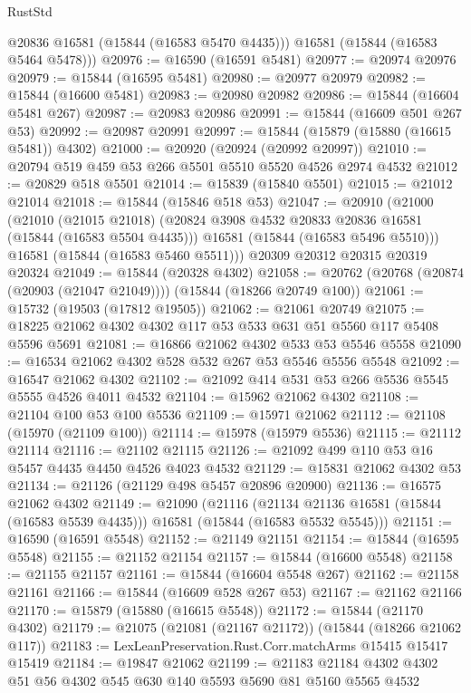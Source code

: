 \begin{lexlean}{RustStd}
\begin{coremodule}
        @20836
        @16581
        (@15844 (@16583 @5470 @4435)))
      @16581
      (@15844 (@16583 @5464 @5478)))
@20976 := @16590 (@16591 @5481)
@20977 := @20974 @20976
@20979 := @15844 (@16595 @5481)
@20980 := @20977 @20979
@20982 := @15844 (@16600 @5481)
@20983 := @20980 @20982
@20986 := @15844 (@16604 @5481 @267)
@20987 := @20983 @20986
@20991 := @15844 (@16609 @501 @267 @53)
@20992 := @20987 @20991
@20997 := @15844 (@15879 (@15880 (@16615 @5481)) @4302)
@21000 := @20920 (@20924 (@20992 @20997))
@21010 := @20794 @519 @459 @53 @266 @5501 @5510 @5520 @4526 @2974 @4532
@21012 := @20829 @518 @5501
@21014 := @15839 (@15840 @5501)
@21015 := @21012 @21014
@21018 := @15844 (@15846 @518 @53)
@21047 := @20910
    (@21000
      (@21010
        (@21015 @21018)
        (@20824 @3908 @4532 @20833 @20836 @16581 (@15844 (@16583 @5504 @4435)))
        @16581
        (@15844 (@16583 @5496 @5510)))
      @16581
      (@15844 (@16583 @5460 @5511)))
    @20309
    @20312
    @20315
    @20319
    @20324
@21049 := @15844 (@20328 @4302)
@21058 := @20762 (@20768 (@20874 (@20903 (@21047 @21049)))) (@15844 (@18266 @20749 @100))
@21061 := @15732 (@19503 (@17812 @19505))
@21062 := @21061 @20749
@21075 := @18225 @21062 @4302 @4302 @117 @53 @533 @631 @51 @5560 @117 @5408 @5596 @5691
@21081 := @16866 @21062 @4302 @533 @53 @5546 @5558
@21090 := @16534 @21062 @4302 @528 @532 @267 @53 @5546 @5556 @5548
@21092 := @16547 @21062 @4302
@21102 := @21092 @414 @531 @53 @266 @5536 @5545 @5555 @4526 @4011 @4532
@21104 := @15962 @21062 @4302
@21108 := @21104 @100 @53 @100 @5536
@21109 := @15971 @21062
@21112 := @21108 (@15970 (@21109 @100))
@21114 := @15978 (@15979 @5536)
@21115 := @21112 @21114
@21116 := @21102 @21115
@21126 := @21092 @499 @110 @53 @16 @5457 @4435 @4450 @4526 @4023 @4532
@21129 := @15831 @21062 @4302 @53
@21134 := @21126 (@21129 @498 @5457 @20896 @20900)
@21136 := @16575 @21062 @4302
@21149 := @21090
    (@21116
      (@21134 @21136 @16581 (@15844 (@16583 @5539 @4435)))
      @16581
      (@15844 (@16583 @5532 @5545)))
@21151 := @16590 (@16591 @5548)
@21152 := @21149 @21151
@21154 := @15844 (@16595 @5548)
@21155 := @21152 @21154
@21157 := @15844 (@16600 @5548)
@21158 := @21155 @21157
@21161 := @15844 (@16604 @5548 @267)
@21162 := @21158 @21161
@21166 := @15844 (@16609 @528 @267 @53)
@21167 := @21162 @21166
@21170 := @15879 (@15880 (@16615 @5548))
@21172 := @15844 (@21170 @4302)
@21179 := @21075 (@21081 (@21167 @21172)) (@15844 (@18266 @21062 @117))
@21183 := LexLeanPreservation.Rust.Corr.matchArms @15415 @15417 @15419
@21184 := @19847 @21062
@21199 := @21183 @21184 @4302 @4302 @51 @56 @4302 @545 @630 @140 @5593 @5690 @81 @5160 @5565 @4532

\end{coremodule}
\end{lexlean}
